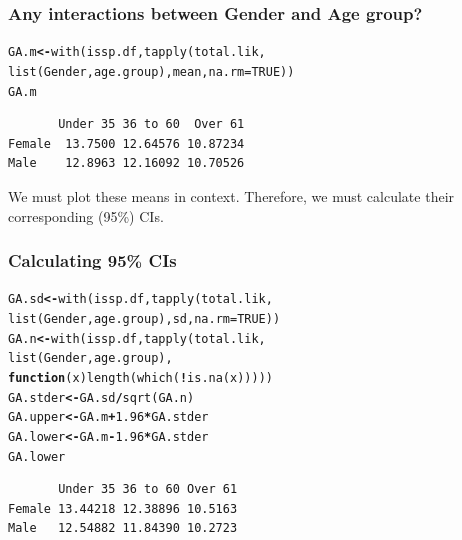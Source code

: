 \documentclass{beamer}\usepackage[]{graphicx}\usepackage[]{color}
\makeatletter
\newcommand{\hlnum}[1]{\textcolor[rgb]{0.533,0,0.133}{#1}}%
\newcommand{\hlopt}[1]{\textcolor[rgb]{0,0,0}{\textbf{#1}}}%
\newcommand{\hlstd}[1]{\textcolor[rgb]{0,0,0}{#1}}%
\newcommand{\hlkwa}[1]{\textcolor[rgb]{0.4,0.067,0.067}{\textbf{#1}}}%
\newcommand{\hlkwb}[1]{\textcolor[rgb]{0,0,0.4}{\textbf{#1}}}%
\newcommand{\hlkwc}[1]{\textcolor[rgb]{0,0,0.4}{#1}}%
\newcommand{\hlkwd}[1]{\textcolor[rgb]{0,0.267,0.4}{#1}}%
\newenvironment{kframe}{%
 \def\at@end@of@kframe{}%
 \ifinner\ifhmode%
  \def\at@end@of@kframe{\end{minipage}}%
  \begin{minipage}{\columnwidth}%
 \fi\fi%
 \def\FrameCommand##1{\hskip\@totalleftmargin \hskip-\fboxsep
 \colorbox{shadecolor}{##1}\hskip-\fboxsep
     \hskip-\linewidth \hskip-\@totalleftmargin \hskip\columnwidth}%
 \MakeFramed {\advance\hsize-\width
   \@totalleftmargin\z@ \linewidth\hsize
   \@setminipage}}%
 {\par\unskip\endMakeFramed%
 \at@end@of@kframe}
\newenvironment{knitrout}{}{} %
\makeatother
\begin{document}
 
\begin{frame}[fragile]
  \frametitle{Any interactions between Gender and Age group?}
\begin{knitrout}
\color{fgcolor}\begin{kframe}
\begin{alltt}
\hlstd{GA.m} \hlkwb{<-} \hlkwd{with}\hlstd{(issp.df,} \hlkwd{tapply}\hlstd{(total.lik,}
           \hlkwd{list}\hlstd{(Gender, age.group), mean,} \hlkwc{na.rm} \hlstd{=} \hlnum{TRUE}\hlstd{))}
\hlstd{GA.m}
\end{alltt}
\begin{verbatim}
       Under 35 36 to 60  Over 61
Female  13.7500 12.64576 10.87234
Male    12.8963 12.16092 10.70526
\end{verbatim}
\end{kframe}
\end{knitrout}
We must plot these means in context. Therefore, we must calculate their corresponding (95\%) CIs.
\end{frame}


\begin{frame}[fragile]
  \frametitle{Calculating 95\% CIs}
\begin{knitrout}
\color{fgcolor}\begin{kframe}
\begin{alltt}
\hlstd{GA.sd} \hlkwb{<-} \hlkwd{with}\hlstd{(issp.df,} \hlkwd{tapply}\hlstd{(total.lik,}
              \hlkwd{list}\hlstd{(Gender, age.group), sd,} \hlkwc{na.rm} \hlstd{=} \hlnum{TRUE}\hlstd{))}
\hlstd{GA.n} \hlkwb{<-} \hlkwd{with}\hlstd{(issp.df,} \hlkwd{tapply}\hlstd{(total.lik,}
            \hlkwd{list}\hlstd{(Gender,age.group),}
            \hlkwa{function}\hlstd{(}\hlkwc{x}\hlstd{)}\hlkwd{length}\hlstd{(}\hlkwd{which}\hlstd{(}\hlopt{!}\hlkwd{is.na}\hlstd{(x)))))}
\hlstd{GA.stder} \hlkwb{<-} \hlstd{GA.sd}\hlopt{/}\hlkwd{sqrt}\hlstd{(GA.n)}
\hlstd{GA.upper} \hlkwb{<-} \hlstd{GA.m} \hlopt{+} \hlnum{1.96}\hlopt{*}\hlstd{GA.stder}
\hlstd{GA.lower} \hlkwb{<-} \hlstd{GA.m} \hlopt{-} \hlnum{1.96}\hlopt{*}\hlstd{GA.stder}
\hlstd{GA.lower}
\end{alltt}
\begin{verbatim}
       Under 35 36 to 60 Over 61
Female 13.44218 12.38896 10.5163
Male   12.54882 11.84390 10.2723
\end{verbatim}
\end{kframe}
\end{knitrout}
\end{frame} 
\end{document}
